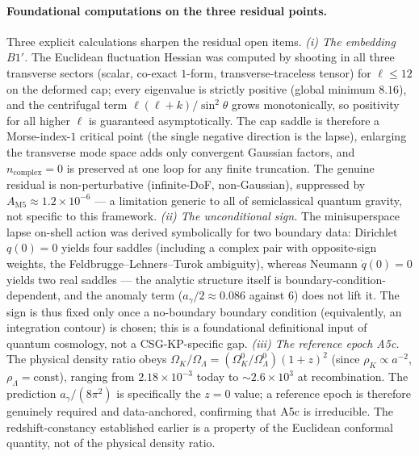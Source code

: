 \documentclass[11pt,a4paper]{article}
\theoremstyle{plain}
\theoremstyle{definition}
\theoremstyle{remark}
\newcommand{\Ok}{\Omega_K}
\newcommand{\OL}{\Omega_\Lambda}
\newcommand{\ag}{a_\gamma}
\begin{document}
\paragraph{Foundational computations on the three residual points.}
Three explicit calculations sharpen the residual open items. \emph{(i) The embedding $B1'$.} The
Euclidean fluctuation Hessian was computed by shooting in all three transverse sectors (scalar,
co-exact $1$-form, transverse-traceless tensor) for $\ell \le 12$ on the deformed cap; every
eigenvalue is strictly positive (global minimum $8.16$), and the centrifugal term
$\ell(\ell{+}k)/\sin^2\theta$ grows monotonically, so positivity for all higher $\ell$ is
guaranteed asymptotically. The cap saddle is therefore a Morse-index-$1$ critical point (the
single negative direction is the lapse), enlarging the transverse mode space adds only convergent
Gaussian factors, and $n_{\mathrm{complex}} = 0$ is preserved at one loop for any finite
truncation. The genuine residual is non-perturbative (infinite-DoF, non-Gaussian), suppressed by
$A_{\mathrm{M5}} \approx 1.2\times10^{-6}$ --- a limitation generic to all of semiclassical
quantum gravity, not specific to this framework. \emph{(ii) The unconditional sign.} The
minisuperspace lapse on-shell action was derived symbolically for two boundary data: Dirichlet
$q(0)=0$ yields four saddles (including a complex pair with opposite-sign weights, the
Feldbrugge--Lehners--Turok ambiguity), whereas Neumann $\dot q(0)=0$ yields two real saddles --- the
analytic structure itself is boundary-condition-dependent, and the anomaly term
($\ag/2 \approx 0.086$ against $6$) does not lift it. The sign is thus fixed only once a
no-boundary boundary condition (equivalently, an integration contour) is chosen; this is a
foundational definitional input of quantum cosmology, not a CSG-KP-specific gap. \emph{(iii) The
reference epoch A5c.} The physical density ratio obeys $\Ok/\OL = (\Ok^0/\OL^0)(1+z)^2$ (since
$\rho_K \propto a^{-2}$, $\rho_\Lambda = \text{const}$), ranging from $2.18\times10^{-3}$ today
to $\sim 2.6\times10^3$ at recombination. The prediction $\ag/(8\pi^2)$ is specifically the $z=0$
value; a reference epoch is therefore genuinely required and data-anchored, confirming that A5c
is irreducible. The redshift-constancy established earlier is a property of the Euclidean
conformal quantity, not of the physical density ratio.
\end{document}
